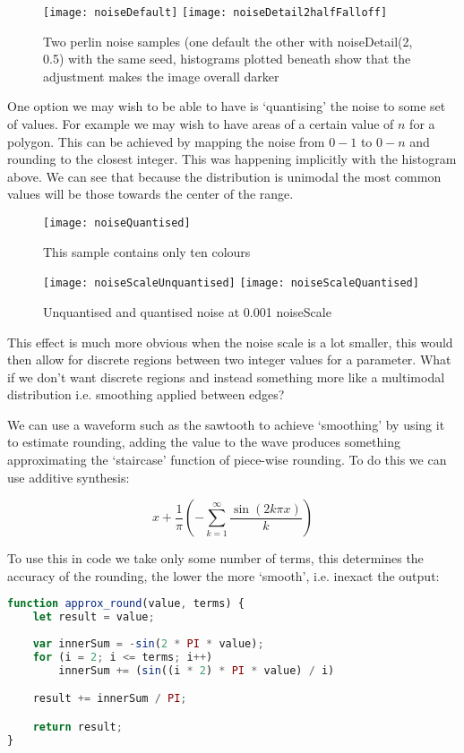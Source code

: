 
\begin{figure}[H]
\centering
\texttt{[image: noiseDefault]}
\hspace{0.2cm}
\texttt{[image: noiseDetail2halfFalloff]}
\caption{Two perlin noise samples (one default the other with
noiseDetail(2, 0.5) with the same seed, histograms plotted beneath show
that the adjustment makes the image overall darker}
\end{figure}

One option we may wish to be able to have is `quantising' the noise to some set
of values. For example we may wish to have areas of a certain value of $n$ for a
polygon. This can be achieved by mapping the noise from $0-1$ to $0-n$ and
rounding to the closest integer. This was happening implicitly with the
histogram above. We can see that because the distribution is unimodal the most
common values will be those towards the center of the range.

\begin{figure}[H]
\centering
\texttt{[image: noiseQuantised]}
\caption{This sample contains only ten colours}
\end{figure}

\begin{figure}[H]
\centering
\texttt{[image: noiseScaleUnquantised]}
\hspace{0.2cm}
\texttt{[image: noiseScaleQuantised]}
\caption{Unquantised and quantised noise at 0.001 noiseScale}
\label{0.001scale}
\end{figure}

This effect is much more obvious when the noise scale is a lot smaller, this
would then allow for discrete regions between two integer values for a
parameter. What if we don't want discrete regions and instead something more
like a multimodal distribution i.e. smoothing applied between edges?

We can use a waveform such as the sawtooth to achieve `smoothing' by using it to
estimate rounding, adding the value to the wave produces something approximating
the `staircase' function of piece-wise rounding. To do this we can use additive
synthesis:

$$x + \frac{1}{\pi} (-\sum^\infty_{k=1} \frac{\sin(2k \pi x)}{k})$$

To use this in code we take only some number of terms, this determines the
accuracy of the rounding, the lower the more `smooth', i.e. inexact the output:
\begin{lstlisting}[language=JavaScript]
function approx_round(value, terms) {
    let result = value;
    
    var innerSum = -sin(2 * PI * value);
    for (i = 2; i <= terms; i++)
        innerSum += (sin((i * 2) * PI * value) / i)

    result += innerSum / PI;

    return result;
}
\end{lstlisting}

